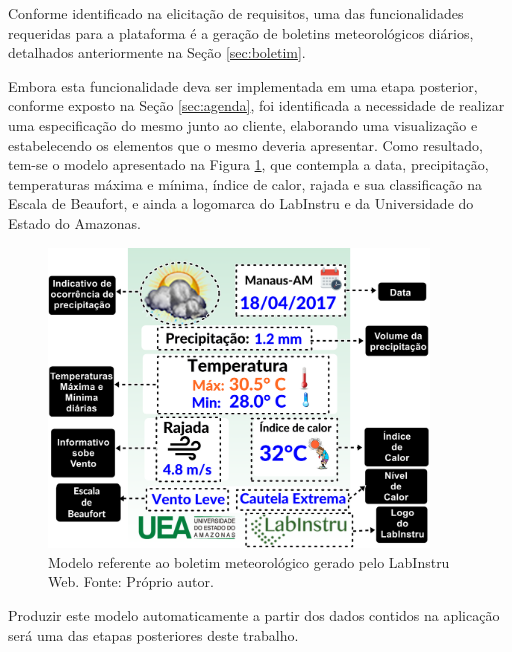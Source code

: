 Conforme identificado na elicitação de requisitos, uma das funcionalidades requeridas para a plataforma é a geração de boletins meteorológicos diários, detalhados anteriormente na Seção \ref{sec:boletim}.

Embora esta funcionalidade deva ser implementada em uma etapa posterior, conforme exposto na Seção \ref{sec:agenda}, foi identificada a necessidade de realizar uma especificação do mesmo junto ao cliente, elaborando uma visualização e estabelecendo os elementos que o mesmo deveria apresentar. Como resultado, tem-se o modelo apresentado na Figura \ref{fig:modeloBoletim}, que contempla a data, precipitação, temperaturas máxima e mínima, índice de calor, rajada e sua classificação na Escala de Beaufort, e ainda a logomarca do LabInstru e da Universidade do Estado do Amazonas.

\newpage

\begin{figure}[h!]
	\centering
	\includegraphics[width=0.9\textwidth]{./img/esbocoBoletim.png}
	\caption{Modelo referente ao boletim meteorológico gerado pelo LabInstru Web. Fonte: Próprio autor.} \label{fig:modeloBoletim}
\end{figure}

Produzir este modelo automaticamente a partir dos dados contidos na aplicação será uma das etapas posteriores deste trabalho.

